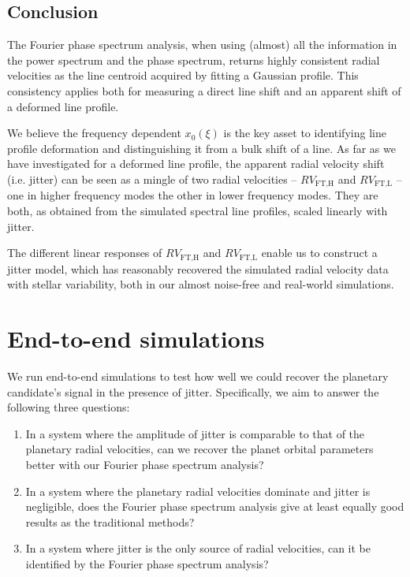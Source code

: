 \subsection{Conclusion}

The Fourier phase spectrum analysis, when using (almost) all the information in the power spectrum and the phase spectrum, returns highly consistent radial velocities as the line centroid acquired by fitting a Gaussian profile. This consistency applies both for measuring a direct line shift and an apparent shift of a deformed line profile. 

We believe the frequency dependent $x_0(\xi)$ is the key asset to identifying line profile deformation and distinguishing it from a bulk shift of a line. As far as we have investigated for a deformed line profile, the apparent radial velocity shift (i.e. jitter) can be seen as a mingle of two radial velocities -- $RV_\text{FT,H}$ and $RV_\text{FT,L}$ -- one in higher frequency modes the other in lower frequency modes. They are both, as obtained from the simulated spectral line profiles, scaled linearly with jitter. 

The different linear responses of $RV_\text{FT,H}$ and $RV_\text{FT,L}$ enable us to construct a jitter model, which has reasonably recovered the simulated radial velocity data with stellar variability, both in our almost noise-free and real-world simulations. 

\pagebreak
\section{End-to-end simulations}
\label{\thesection}
\label{sec:end-to-end}

We run end-to-end simulations to test how well we could recover the planetary candidate's signal in the presence of jitter. Specifically, we aim to answer the following three questions:
\begin{enumerate}
	\item In a system where the amplitude of jitter is comparable to that of the planetary radial velocities, can we recover the planet orbital parameters better with our Fourier phase spectrum analysis? 
	\item In a system where the planetary radial velocities dominate and jitter is negligible, does the Fourier phase spectrum analysis give at least equally good results as the traditional methods? 
	\item In a system where jitter is the only source of radial velocities, can it be identified by the Fourier phase spectrum analysis?
\end{enumerate}

